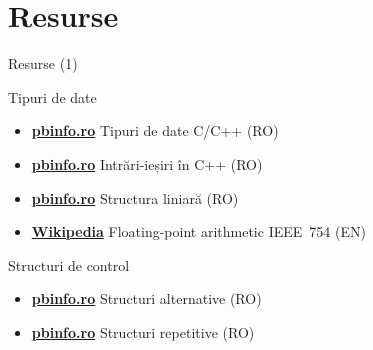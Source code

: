 ﻿\documentclass{beamer}
\begin{document}
\section{Resurse}

\begin{frame}{Resurse (1)}
  \begin{block}{Tipuri de date}
    \begin{itemize}\footnotesize\itemsep0pt
      \item \href{https://www.pbinfo.ro/articole/58/tipuri-de-date-c-c}{\textbf{pbinfo.ro}} \textemdash{} Tipuri de date C/C++ (RO)
      \item \href{https://www.pbinfo.ro/articole/60/intrari-iesiri-in-cpp}{\textbf{pbinfo.ro}} \textemdash{} Intrări-ieșiri în C++ (RO)
      \item \href{https://www.pbinfo.ro/articole/68/structura-liniara}{\textbf{pbinfo.ro}} \textemdash{} Structura liniară (RO)
      \item \href{https://en.wikipedia.org/wiki/Floating-point_arithmetic\#IEEE_754:_floating_point_in_modern_computers}{\textbf{Wikipedia}} \textemdash{} Floating-point arithmetic \textemdash{} IEEE~754 (EN)
    \end{itemize}
  \end{block}
  \vspace{-6pt}
  \begin{block}{Structuri de control}
    \begin{itemize}\footnotesize\itemsep0pt
      \item \href{https://www.pbinfo.ro/articole/70/structuri-alternative}{\textbf{pbinfo.ro}} \textemdash{} Structuri alternative (RO)
      \item \href{https://www.pbinfo.ro/articole/71/structuri-repetitive}{\textbf{pbinfo.ro}} \textemdash{} Structuri repetitive (RO)
    \end{itemize}
  \end{block}
\end{frame}
\end{document}
